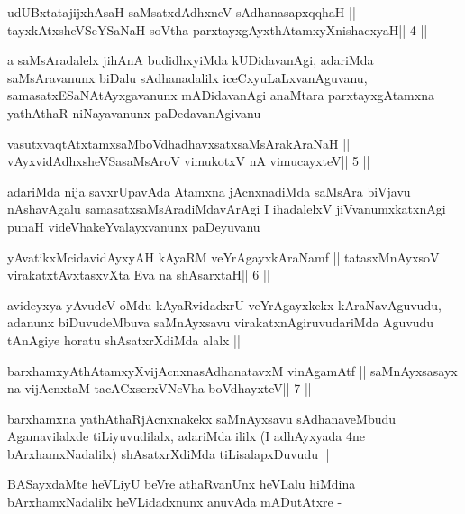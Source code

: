 \begin{shl}
udUBxtatajijxhAsaH saMsatxdAdhxneV sAdhanasapxqqhaH ||
tayxkAtxsheVSeYSaNaH soV\s tha parxtayxgAyxthAtamxyXnishacxyaH\hfill || 4 ||
\end{shl}

\begin{artha}
a saMsAradalelx jihAnA budidhxyiMda kUDidavanAgi, adariMda
saMsAravanunx biDalu sAdhanadalilx iceCxyuLaLxvanAguvanu,
samasatxESaNAtAyxgavanunx mADidavanAgi anaMtara parxtayxgAtamxna
yathAthaR niNayavanunx paDedavanAgivanu 
\end{artha}

\begin{shl}
vasutxvaqtAtxtamxsaMboVdhadhavxsatxsaMsArakAraNaH ||
vAyxvidAdhxsheVSasaMsAroV vimukotxV nA vimucayxteV\hfill || 5 ||
\end{shl}

\begin{artha}
adariMda nija savxrUpavAda Atamxna jAcnxnadiMda saMsAra biVjavu
nAshavAgalu samasatxsaMsAradiMdavArAgi I ihadalelxV jiVvanumxkatxnAgi
punaH videVhakeYvalayxvanunx paDeyuvanu 
\end{artha}

\begin{shl}
yAvatikxMcidavidAyxyAH kAyaRM veYrAgayxkAraNamf ||
tatasxMnAyxsoV virakatxtAvxtasxvXta Eva na shAsarxtaH\hfill || 6 ||
\end{shl}

\begin{artha}
avideyxya yAvudeV oMdu kAyaRvidadxrU veYrAgayxkekx kAraNavAguvudu,
adanunx biDuvudeMbuva saMnAyxsavu virakatxnAgiruvudariMda Aguvudu
tAnAgiye horatu shAsatxrXdiMda alalx ||
\end{artha}

\begin{shl}
barxhamxyAthAtamxyXvijAcnxnasAdhanatavxM vinA\s\s gamAtf ||
saMnAyxsasayx na vijAcnxtaM tacACxserxVNeVha boVdhayxteV\hfill || 7 ||
\end{shl}

\begin{artha}
barxhamxna yathAthaRjAcnxnakekx saMnAyxsavu sAdhanaveMbudu
Agamavilalxde tiLiyuvudilalx, adariMda ililx (I adhAyxyada 4ne
bArxhamxNadalilx) shAsatxrXdiMda tiLisalapxDuvudu ||
\end{artha}

\begin{artha}
BASayxdaMte heVLiyU beVre athaRvanUnx heVLalu hiMdina bArxhamxNadalilx
heVLidadxnunx anuvAda mADutAtxre -
\end{artha}

